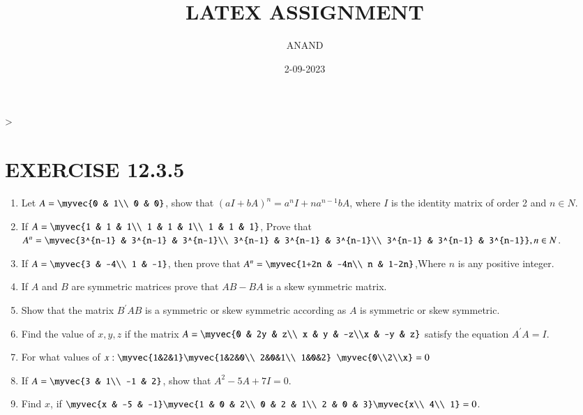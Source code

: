 \documentclass{article}
\theoremstyle{remark}
\begin{document}
\title{LATEX ASSIGNMENT}
\author{ANAND}
\date{2-09-2023}
\maketitle                                                                       >
\section*{EXERCISE 12.3.5}
\begin{enumerate}
\item Let $A=\myvec{0 & 1\\ 0 & 0}$, show that $(aI+bA)^n= a^nI+na^{n-1} bA$, where $I$ is the identity matrix of order 2 and $n \in N$.
\item If $A=\myvec{1 & 1 & 1\\ 1 & 1 & 1\\ 1 & 1 & 1}$, Prove that $A^n=\myvec{3^{n-1} & 3^{n-1} & 3^{n-1}\\ 3^{n-1} & 3^{n-1} & 3^{n-1}\\ 3^{n-1} & 3^{n-1} & 3^{n-1}}, n \in N$.
\item If $A=\myvec{3 & -4\\ 1 & -1}$, then prove that $A^n=\myvec{1+2n & -4n\\ n & 1-2n}$,Where $n$ is any positive integer.
\item If $A$ and $B$ are symmetric matrices prove that $AB-BA$ is a skew symmetric matrix.
\item Show that the matrix  $B^{\prime}AB$ is a symmetric or skew symmetric according as $A$ is symmetric or skew symmetric.
\item Find the value of $x,y,z$ if the matrix $A=\myvec{0 & 2y & z\\ x & y & -z\\x & -y & z}$ satisfy the equation $A^{\prime}A=I$.
\item For what values  of $x : \myvec{1&2&1} \myvec{1&2&0\\ 2&0&1\\ 1&0&2}$ $\myvec{0\\2\\x}=0$
\item If $A=\myvec{3 & 1\\ -1 & 2}$, show that $A^2-5A+7I=0$.
\item Find $x$, if $\myvec{x & -5 & -1} \myvec{1 & 0 & 2\\ 0 & 2 & 1\\ 2 & 0 & 3} \myvec{x\\ 4\\ 1}=0$. 

\end{enumerate}
\end{document}
